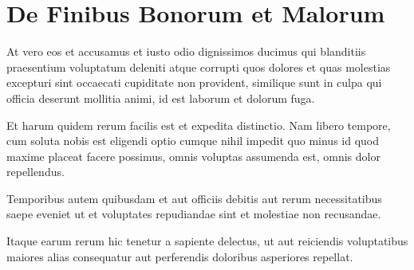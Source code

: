 \section{De Finibus Bonorum et Malorum}

At vero eos et accusamus et iusto odio dignissimos ducimus qui blanditiis praesentium voluptatum deleniti atque corrupti quos dolores et quas molestias excepturi sint occaecati cupiditate non provident, similique sunt in culpa qui officia deserunt mollitia animi, id est laborum et dolorum fuga.  

Et harum quidem rerum facilis est et expedita distinctio. Nam libero tempore, cum soluta nobis est eligendi optio cumque nihil impedit quo minus id quod maxime placeat facere possimus, omnis voluptas assumenda est, omnis dolor repellendus.  

Temporibus autem quibusdam et aut officiis debitis aut rerum necessitatibus saepe eveniet ut et voluptates repudiandae sint et molestiae non recusandae.  

Itaque earum rerum hic tenetur a sapiente delectus, ut aut reiciendis voluptatibus maiores alias consequatur aut perferendis doloribus asperiores repellat.
